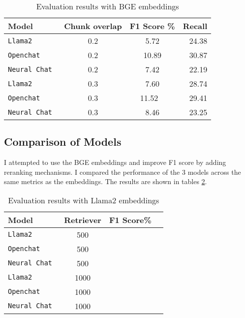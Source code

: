 \documentclass[11pt]{article}
\begin{document}
  \begin{table}
    \centering
      \begin{tabular}{ l c c r }
      \hline
        \textbf{Model} & \textbf{Chunk overlap} & \textbf{F1 Score \%} & \textbf{Recall}\\
        \hline
        \verb|Llama2 | & 0.2 &  {5.72} & {24.38} \\
        \verb|Openchat | & 0.2 & {10.89}  & {30.87}\\ 
        \verb|Neural Chat | & 0.2 & {7.42}  & {22.19}\\ 
        \verb|Llama2 | & 0.3 &  {7.60}  & {28.74}\\
        \verb|Openchat | & 0.3 & {11.52} \ & {29.41} \\ 
        \verb|Neural Chat | & 0.3 & {8.46}  & {23.25}\\ 
        \hline
      \end{tabular}
  \caption{Evaluation results with BGE embeddings}
  \label{tab:accents2}
  \end{table}

\subsection{Comparison of Models}

I attempted to use the BGE embeddings and improve F1 score by adding reranking mechanisms. I compared the performance of the 3 models across the same metrics as the embeddings. The results are shown in tables \ref{tab:tab3}.
  
\begin{table}
  \centering
    \begin{tabular}{ l c c r }
    \hline
      \textbf{Model} & \textbf{Retriever} & \textbf{F1 Score\%} \\
      \hline
      \verb|Llama2 | & 500 &  {} & {} \\
      \verb|Openchat | & 500 & {}  & {}\\ 
      \verb|Neural Chat | & 500 &{}  & {}\\ 
      \verb|Llama2 | & 1000 &  {}  & {}\\
      \verb|Openchat | & 1000 & {} \ & {} \\ 
      \verb|Neural Chat | & 1000 &{}  & {}\\ 
      \hline
    \end{tabular}
  \caption{Evaluation results with Llama2 embeddings}
  \label{tab:tab3}
  \end{table}
\end{document}
